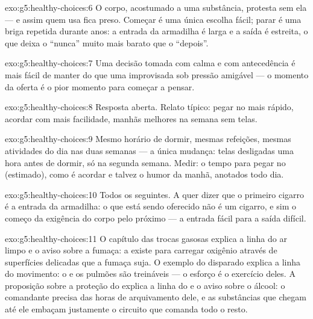 \begin{solution}{exo:g5:healthy-choices:6}
O corpo, acostumado a uma substância, protesta sem ela --- e assim
quem usa fica preso. Começar é uma única escolha fácil; parar é uma
briga repetida durante anos: a entrada da armadilha é larga e a saída
é estreita, o que deixa o ``nunca'' muito mais barato que o
``depois''.
\end{solution}

\begin{solution}{exo:g5:healthy-choices:7}
Uma decisão tomada com calma e com antecedência é mais fácil de
manter do que uma improvisada sob pressão amigável --- o momento da
oferta é o pior momento para começar a pensar.
\end{solution}

\begin{solution}{exo:g5:healthy-choices:8}
Resposta aberta. Relato típico: pegar no  mais rápido, acordar
com mais facilidade, manhãs melhores na semana sem telas.
\end{solution}

\begin{solution}{exo:g5:healthy-choices:9}
Mesmo horário de dormir, mesmas refeições, mesmas atividades do dia
nas duas semanas --- a única mudança: telas desligadas uma hora antes
de dormir, só na segunda semana. Medir: o tempo para pegar no 
(estimado), como é acordar e talvez o humor da manhã, anotados todo
dia.
\end{solution}

\begin{solution}{exo:g5:healthy-choices:10}
Todos os seguintes. A  quer dizer que o primeiro cigarro é
a entrada da armadilha: o que está sendo oferecido não é um cigarro,
e sim o começo da exigência do corpo pelo próximo --- a entrada fácil
para a saída difícil.
\end{solution}

\begin{solution}{exo:g5:healthy-choices:11}
O capítulo das trocas gasosas explica a linha do ar limpo e o aviso
sobre a fumaça: a  existe para carregar oxigênio através de
superfícies delicadas que a fumaça suja. O exemplo do 
disparado explica a linha do movimento: o  e os pulmões são
treináveis --- o esforço é o exercício deles. A proposição sobre a
proteção do  explica a linha do  e o aviso sobre o álcool:
o comandante precisa das horas de arquivamento dele, e as substâncias
que chegam até ele embaçam justamente o circuito que comanda todo o
resto.
\end{solution}
